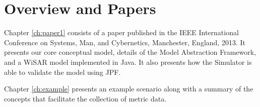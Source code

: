 \begin{comment}
   Known high and low workload scenarios, similar to those in WiSAR, are placed in the model.  Workload is consistent if it rises and falls as expected given known scenarios, and a {\em sensitivity}We were very pleased with the results of this case study.  Firstly because the Model Abstraction Framework proved capable of expressing our highly abstracted model.  Second, by using a {\em consistency}

using the Workload Viewer we were able to show that the Model Abstraction Framework is capable of expressing a UAS using high levels of abstraction.  The results of   They also demonstrate the ability to model systems using varying degrees of abstraction.  The verification of the metrics in this thesis is done by a {\em consistency} approach, showing that workload rises and falls as expected given known difficult and easy scenarios, respectively.  Future work will provide a more detailed verification.
\end{comment}

\section{Overview and Papers}

Chapter \ref{ch:paper1} consists of a paper published in the IEEE International Conference on Systems, Man, and Cybernetics, Manchester, England, 2013. It presents our core conceptual model, details of the Model Abstraction Framework, and a WiSAR model implemented in Java.  It also presents how the Simulator is able to validate the model using JPF.

Chapter \ref{ch:example} presents an example scenario along with a summary of the concepts that facilitate the collection of metric data.
\begin{comment}
Chapter 3 presents an extension of our conceptual model in the form of the DiTG.  It also presents a formal taxonomy of workload metrics and how that taxonomy applies to our conceptual model.  Lastly it reports the results of adding the workload metrics into the simulation framework.  Much of the work performed for this paper was completed by others; it has been added to this thesis for completeness.


Chapter 4 presents an XML Model Extension for the Model Abstraction Framework which makes it easier for the modeler to create a labeled state transition system and reduces the likelihood of coding errors in the resulting Java implementation of that system.
\end{comment}

